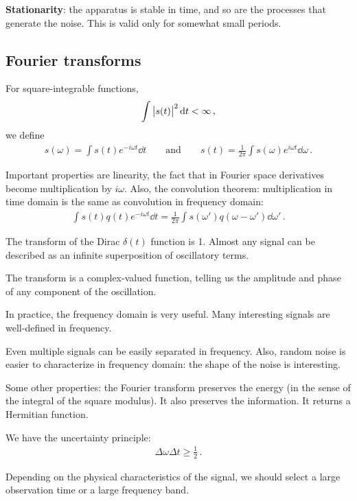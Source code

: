 \documentclass[main.tex]{subfiles}
\begin{document}
\textbf{Stationarity}: the apparatus is stable in time, and so are the processes that generate the noise.
This is valid only for somewhat small periods. 

\subsection{Fourier transforms}

For square-integrable functions, 
%
\begin{align}
\int \abs{s(t)}^2 \dd{t} < \infty 
\,,
\end{align}
%
we define 
%
\begin{align}
s(\omega ) = \int s(t) e^{-i \omega t} \dd{t}
\qquad \text{and} \qquad
s(t) = \frac{1}{2 \pi } \int s(\omega ) e^{i \omega t} \dd{\omega } 
\,.
\end{align}

Important properties are linearity, the fact that in Fourier space derivatives become multiplication by \(i \omega \). 
Also, the convolution theorem: multiplication in time domain is the same as convolution in frequency domain: 
%
\begin{align}
\int s(t) q(t) e^{-i \omega t} \dd{t} = \frac{1}{2 \pi } \int s(\omega') q (\omega - \omega') \dd{\omega'}
\,.
\end{align}

The transform of the Dirac \(\delta(t) \) function is 1.
Almost any signal can be described as an infinite superposition of oscillatory terms. 

The transform is a complex-valued function, telling us the amplitude and phase of any component of the oscillation.

In practice, the frequency domain is very useful. Many interesting signals are well-defined in frequency.

Even multiple signals can be easily separated in frequency. 
Also, random noise is easier to characterize in frequency domain: the shape of the noise is interesting.

Some other properties: the Fourier transform preserves the energy (in the sense of the integral of the square modulus). 
It also preserves the information. It returns a Hermitian function. 

We have the uncertainty principle: 
%
\begin{align}
\Delta \omega \Delta t \geq \frac{1}{2} 
\,.
\end{align}

Depending on the physical characteristics of the signal, we should select a large observation time or a large frequency band.
\end{document}
